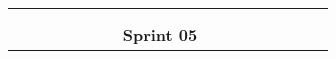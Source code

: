 \begin{longtable}[c]{llclllllllllllllllll}
        \multicolumn{4}{|l|}{}                                                                                                                                                                                                                                                                                                                           & \multicolumn{15}{l|}{}                                                                                                                                                                                                                                                                                                                                                                                                                                                                                                                    &  \\ \cline{1-19}
        \multicolumn{1}{|l|}{}                                                                & \multicolumn{1}{l|}{}                                                          & \multicolumn{1}{l|}{}                                                            & \multicolumn{1}{l|}{}                                                                &                                 &                                 &                                 &                                 &                                 &                                 &                                 &                                 &                                 &                                 &                                 &                                 &                                 &                                 & \multicolumn{1}{l|}{}                         &  \\ \cline{1-19}
        \multicolumn{19}{|c|}{\cellcolor[HTML]{305496}\textbf{Sprint 05}}                                                                                                                                                                                                                                                                                                                                                                                                                                                                                                                                                                                                                                                                                                                                                                                                                            &  \\ \cline{1-19}

\end{longtable}

